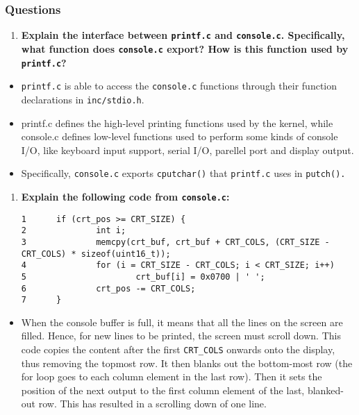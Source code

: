\documentclass[]{article}
\begin{document}
\subsubsection{Questions}

\begin{enumerate}
\def\labelenumi{\arabic{enumi}.}
\itemsep1pt\parskip0pt
\item
  \textbf{Explain the interface between \texttt{printf.c} and
  \texttt{console.c}. Specifically, what function does
  \texttt{console.c} export? How is this function used by
  \texttt{printf.c}?}
\end{enumerate}

\begin{itemize}
\itemsep1pt\parskip0pt
\item
  \texttt{printf.c} is able to access the \texttt{console.c} functions
  through their function declarations in \texttt{inc/stdio.h}.
\item
  printf.c defines the high-level printing functions used by the kernel,
  while console.c defines low-level functions used to perform some kinds
  of console I/O, like keyboard input support, serial I/O, parellel port
  and display output.
\item
  Specifically, \texttt{console.c} exports \texttt{cputchar()} that
  \texttt{printf.c} uses in \texttt{putch().}
\end{itemize}

\begin{enumerate}
\def\labelenumi{\arabic{enumi}.}
\setcounter{enumi}{1}
\item
  \textbf{Explain the following code from \texttt{console.c}:}

\begin{verbatim}
1      if (crt_pos >= CRT_SIZE) {
2              int i;
3              memcpy(crt_buf, crt_buf + CRT_COLS, (CRT_SIZE - CRT_COLS) * sizeof(uint16_t));
4              for (i = CRT_SIZE - CRT_COLS; i < CRT_SIZE; i++)
5                      crt_buf[i] = 0x0700 | ' ';
6              crt_pos -= CRT_COLS;
7      }
\end{verbatim}
\end{enumerate}

\begin{itemize}
\itemsep1pt\parskip0pt
\item
  When the console buffer is full, it means that all the lines on the
  screen are filled. Hence, for new lines to be printed, the screen must
  scroll down. This code copies the content after the first
  \texttt{CRT\_COLS} onwards onto the display, thus removing the topmost
  row. It then blanks out the bottom-most row (the for loop goes to each
  column element in the last row). Then it sets the position of the next
  output to the first column element of the last, blanked-out row. This
  has resulted in a scrolling down of one line.
\end{itemize}
\end{document}
